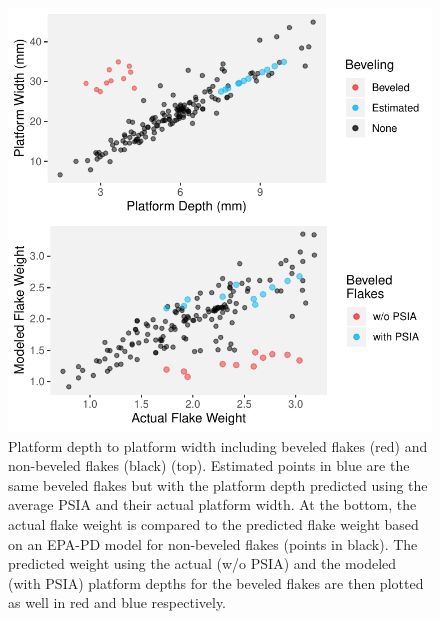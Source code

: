 \documentclass[10pt,letterpaper]{article}
\begin{document}
\begin{figure}
\centering
\includegraphics{PSIA_Manuscript_files/figure-latex/fig11-bevel_with_estimated_pd-1.pdf}
\caption{Platform depth to platform width including beveled flakes (red)
and non-beveled flakes (black) (top). Estimated points in blue are the
same beveled flakes but with the platform depth predicted using the
average PSIA and their actual platform width. At the bottom, the actual
flake weight is compared to the predicted flake weight based on an
EPA-PD model for non-beveled flakes (points in black). The predicted
weight using the actual (w/o PSIA) and the modeled (with PSIA) platform
depths for the beveled flakes are then plotted as well in red and blue
respectively.}
\end{figure}
\end{document}
